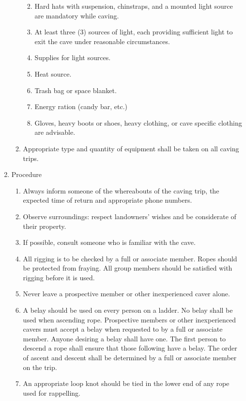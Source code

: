\documentclass[
]{article}
\providecommand{\tightlist}{%
  \setlength{\itemsep}{0pt}\setlength{\parskip}{0pt}}
\begin{document}
\begin{enumerate}
\begin{enumerate}
    \begin{enumerate}
    \def\labelenumiii{\roman{enumiii}.}
    \tightlist
    \item
      Hard hats with suspension, chinstraps, and a mounted light source
      are mandatory while caving.
    \item
      At least three (3) sources of light, each providing sufficient
      light to exit the cave under reasonable circumstances.
    \item
      Supplies for light sources.
    \item
      Heat source.
    \item
      Trash bag or space blanket.
    \item
      Energy ration (candy bar, etc.)
    \item
      Gloves, heavy boots or shoes, heavy clothing, or cave specific
      clothing are advisable.
    \end{enumerate}
  \item
    Appropriate type and quantity of equipment shall be taken on all
    caving trips.
  \end{enumerate}
\item
  Procedure

  \begin{enumerate}
  \def\labelenumii{\Alph{enumii}.}
  \tightlist
  \item
    Always inform someone of the whereabouts of the caving trip, the
    expected time of return and appropriate phone numbers.
  \item
    Observe surroundings: respect landowners' wishes and be considerate
    of their property.
  \item
    If possible, consult someone who is familiar with the cave.
  \item
    All rigging is to be checked by a full or associate member. Ropes
    should be protected from fraying. All group members should be
    satisfied with rigging before it is used.
  \item
    Never leave a prospective member or other inexperienced caver alone.
  \item
    A belay should be used on every person on a ladder. No belay shall
    be used when ascending rope. Prospective members or other
    inexperienced cavers must accept a belay when requested to by a full
    or associate member. Anyone desiring a belay shall have one. The
    first person to descend a rope shall ensure that those following
    have a belay. The order of ascent and descent shall be determined by
    a full or associate member on the trip.
  \item
    An appropriate loop knot should be tied in the lower end of any rope
    used for rappelling.
  \end{enumerate}
\end{enumerate}
\end{document}
